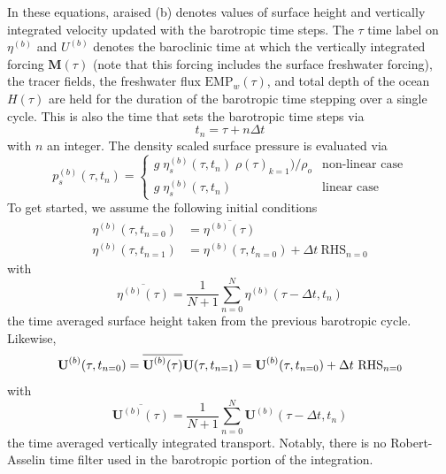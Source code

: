 In these equations, araised (b) denotes values of surface height and vertically integrated velocity updated with the barotropic time steps. The $\tau$ time label on $\eta^{(b)}$ 
and $U^{(b)}$ denotes the baroclinic time at which the vertically integrated forcing $\textbf{M}(\tau)$ (note that this forcing includes the surface freshwater forcing), the tracer fields, the freshwater flux $\text{EMP}_w(\tau)$, and total depth of the ocean $H(\tau)$ are held for the duration of the barotropic time stepping over a single cycle. This is also the time 
that sets the barotropic time steps via 
\begin{equation} \label{DYN_spg_ts_t}
t_n=\tau+n\Delta t   
\end{equation}
with $n$ an integer. The density scaled surface pressure is evaluated via 
\begin{equation} \label{DYN_spg_ts_ps}
p_s^{(b)}(\tau,t_{n}) = \begin{cases}
	g \;\eta_s^{(b)}(\tau,t_{n}) \;\rho(\tau)_{k=1}) / \rho_o  &      \text{non-linear case} \\
	g \;\eta_s^{(b)}(\tau,t_{n})  &      \text{linear case} 
	\end{cases}
\end{equation}
To get started, we assume the following initial conditions 
\begin{equation} \label{DYN_spg_ts_eta}
\begin{split}
\eta^{(b)}(\tau,t_{n=0}) &= \overline{\eta^{(b)}(\tau)}
\\
\eta^{(b)}(\tau,t_{n=1}) &= \eta^{(b)}(\tau,t_{n=0}) + \Delta t \ \text{RHS}_{n=0} 
\end{split}
\end{equation}
with 
\begin{equation} \label{DYN_spg_ts_etaF}
 \overline{\eta^{(b)}(\tau)} = \frac{1}{N+1} \sum\limits_{n=0}^N \eta^{(b)}(\tau-\Delta t,t_{n})
\end{equation}
the time averaged surface height taken from the previous barotropic cycle. Likewise, 
\begin{equation} \label{DYN_spg_ts_u}
\textbf{U}^{(b)}(\tau,t_{n=0}) = \overline{\textbf{U}^{(b)}(\tau)}	\\
\\
\textbf{U}(\tau,t_{n=1}) = \textbf{U}^{(b)}(\tau,t_{n=0}) + \Delta t \ \text{RHS}_{n=0}  	
\end{equation}
with 
\begin{equation} \label{DYN_spg_ts_u}
 \overline{\textbf{U}^{(b)}(\tau)} 
 	= \frac{1}{N+1} \sum\limits_{n=0}^N\textbf{U}^{(b)}(\tau-\Delta t,t_{n})
\end{equation}
the time averaged vertically integrated transport. Notably, there is no Robert-Asselin time filter used in the barotropic portion of the integration. 

